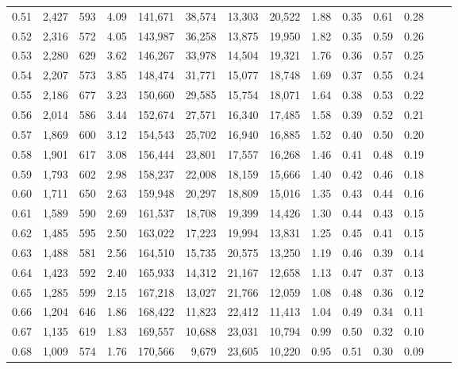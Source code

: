 \begin{tabular}{rrrrrrrrrrrrrr}
0.51 &  2,427 &  593 &    4.09 &  141,671 &   38,574 &  13,303 &  20,522 &  1.88 &  0.35 &  0.61 &      0.28 \\
0.52 &  2,316 &  572 &    4.05 &  143,987 &   36,258 &  13,875 &  19,950 &  1.82 &  0.35 &  0.59 &      0.26 \\
0.53 &  2,280 &  629 &    3.62 &  146,267 &   33,978 &  14,504 &  19,321 &  1.76 &  0.36 &  0.57 &      0.25 \\
0.54 &  2,207 &  573 &    3.85 &  148,474 &   31,771 &  15,077 &  18,748 &  1.69 &  0.37 &  0.55 &      0.24 \\
0.55 &  2,186 &  677 &    3.23 &  150,660 &   29,585 &  15,754 &  18,071 &  1.64 &  0.38 &  0.53 &      0.22 \\
0.56 &  2,014 &  586 &    3.44 &  152,674 &   27,571 &  16,340 &  17,485 &  1.58 &  0.39 &  0.52 &      0.21 \\
0.57 &  1,869 &  600 &    3.12 &  154,543 &   25,702 &  16,940 &  16,885 &  1.52 &  0.40 &  0.50 &      0.20 \\
0.58 &  1,901 &  617 &    3.08 &  156,444 &   23,801 &  17,557 &  16,268 &  1.46 &  0.41 &  0.48 &      0.19 \\
0.59 &  1,793 &  602 &    2.98 &  158,237 &   22,008 &  18,159 &  15,666 &  1.40 &  0.42 &  0.46 &      0.18 \\
0.60 &  1,711 &  650 &    2.63 &  159,948 &   20,297 &  18,809 &  15,016 &  1.35 &  0.43 &  0.44 &      0.16 \\
0.61 &  1,589 &  590 &    2.69 &  161,537 &   18,708 &  19,399 &  14,426 &  1.30 &  0.44 &  0.43 &      0.15 \\
0.62 &  1,485 &  595 &    2.50 &  163,022 &   17,223 &  19,994 &  13,831 &  1.25 &  0.45 &  0.41 &      0.15 \\
0.63 &  1,488 &  581 &    2.56 &  164,510 &   15,735 &  20,575 &  13,250 &  1.19 &  0.46 &  0.39 &      0.14 \\
0.64 &  1,423 &  592 &    2.40 &  165,933 &   14,312 &  21,167 &  12,658 &  1.13 &  0.47 &  0.37 &      0.13 \\
0.65 &  1,285 &  599 &    2.15 &  167,218 &   13,027 &  21,766 &  12,059 &  1.08 &  0.48 &  0.36 &      0.12 \\
0.66 &  1,204 &  646 &    1.86 &  168,422 &   11,823 &  22,412 &  11,413 &  1.04 &  0.49 &  0.34 &      0.11 \\
0.67 &  1,135 &  619 &    1.83 &  169,557 &   10,688 &  23,031 &  10,794 &  0.99 &  0.50 &  0.32 &      0.10 \\
0.68 &  1,009 &  574 &    1.76 &  170,566 &    9,679 &  23,605 &  10,220 &  0.95 &  0.51 &  0.30 &      0.09 \\

\end{tabular}
